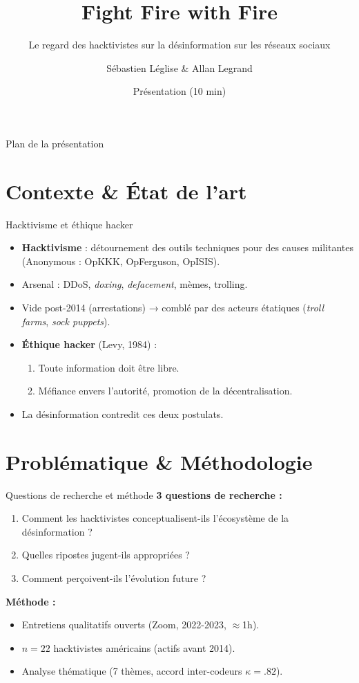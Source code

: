 \documentclass[10pt, french]{beamer}
\title{Fight Fire with Fire}
\subtitle{Le regard des hacktivistes sur la désinformation sur les réseaux sociaux}
\author{Sébastien Léglise \& Allan Legrand}
\institute{ENSI Caen -- Avril 2026}
\date{Présentation (10 min)}
\begin{document}
\begin{frame}
\titlepage
{}
\end{frame}

\begin{frame}{Plan de la présentation}
\tableofcontents
\end{frame}

\section{Contexte \& État de l'art}
\begin{frame}{Hacktivisme et éthique hacker}
\begin{itemize}
  \item \textbf{Hacktivisme} : détournement des outils techniques pour des causes militantes (Anonymous : OpKKK, OpFerguson, OpISIS).
  \item Arsenal : DDoS, \textit{doxing}, \textit{defacement}, mèmes, trolling.
  \item Vide post-2014 (arrestations) → comblé par des acteurs étatiques (\textit{troll farms}, \textit{sock puppets}).
  \item \textbf{Éthique hacker} (Levy, 1984) :
    \begin{enumerate}
      \item Toute information doit être libre.
      \item Méfiance envers l'autorité, promotion de la décentralisation.
    \end{enumerate}
  \item La désinformation contredit ces deux postulats.
\end{itemize}
\end{frame}

\section{Problématique \& Méthodologie}
\begin{frame}{Questions de recherche et méthode}
\textbf{3 questions de recherche :}
\begin{enumerate}
  \item Comment les hacktivistes conceptualisent-ils l'écosystème de la désinformation ?
  \item Quelles ripostes jugent-ils appropriées ?
  \item Comment perçoivent-ils l'évolution future ?
\end{enumerate}
\vspace{0.3cm}
\textbf{Méthode :}
\begin{itemize}
  \item Entretiens qualitatifs ouverts (Zoom, 2022-2023, $\approx$1h).
  \item $n = 22$ hacktivistes américains (actifs avant 2014).
  \item Analyse thématique (7 thèmes, accord inter-codeurs $\kappa = .82$).
\end{itemize}
\end{frame}
\end{document}

